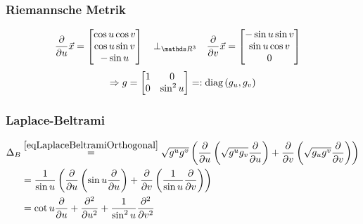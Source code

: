     \subsubsection{Riemannsche Metrik}
      \begin{align}
        \frac{\partial}{\partial u}\vec{x}
              &=\begin{bmatrix}
                  \cos u \cos v \\
                  \cos u \sin v \\
                  -\sin u
                \end{bmatrix}
              \quad\bot_{\R^{3}}\quad
              \frac{\partial}{\partial v}\vec{x}
              =\begin{bmatrix}
                        -\sin u \sin v \\
                        \sin u \cos v \\
                        0
                \end{bmatrix}
      \end{align}
      \begin{align}
        \Rightarrow g = \begin{bmatrix}
              1 & 0 \\ 0 & \sin^{2} u
            \end{bmatrix}
          =: \text{diag}\left( g_{u}, g_{v} \right)
      \end{align}

    \subsubsection{Laplace-Beltrami}
      \begin{align}
        \Delta_{B} &\overset{\eqref{eqLaplaceBeltramiOrthogonal}}{=} \sqrt{g^{u}g^{v}} 
                      \left(  \frac{\partial}{\partial u} 
                             \left( \sqrt{g^{u}g_{v}} \frac{\partial}{\partial u} \right) 
                                  + \frac{\partial}{\partial v} \left( \sqrt{g_{u}g^{v}} \frac{\partial}{\partial v} 
                       \right) \right) \\
                   &= \frac{1}{\sin u}
                      \left(  \frac{\partial}{\partial u} 
                             \left( \sin u \frac{\partial}{\partial u} \right) 
                                  + \frac{\partial}{\partial v} \left( \frac{1}{\sin u} \frac{\partial}{\partial v} 
                       \right) \right) \\
                   &= \cot u \frac{\partial}{\partial u} 
                        + \frac{\partial^{2}}{\partial u^{2}}
                        + \frac{1}{\sin^{2} u} \frac{\partial^{2}}{\partial v^{2}}
      \end{align}

